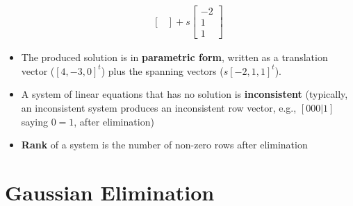 \begin{itemize}
\begin{align*}
\begin{bmatrix}
      \end{bmatrix}
      +
      s \begin{bmatrix}
        -2\\ 1\\ 1
      \end{bmatrix}
    \end{align*}
  \item The produced solution is in \textbf{parametric form}, written as a translation vector ($[ 4, -3, 0]^t$) plus the spanning vectors ($s[-2, 1, 1]^t$).
  \item A system of linear equations that has no solution is \textbf{inconsistent} (typically, an inconsistent system produces an inconsistent row vector, e.g., $[ 0 0 0 | 1]$ saying $0 = 1$, after elimination)
  \item \textbf{Rank} of a system is the number of non-zero rows after elimination
\end{itemize}

\section{Gaussian Elimination}

